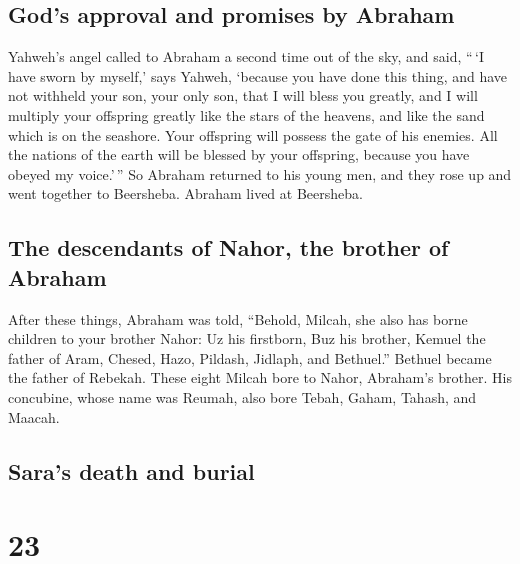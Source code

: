 \hypertarget{gods-approval-and-promises-by-abraham}{%
\subsection{God's approval and promises by
Abraham}\label{gods-approval-and-promises-by-abraham}}

 Yahweh's angel called to Abraham a second time out of
the sky,  and said, ``\,`I have sworn by myself,' says
Yahweh, `because you have done this thing, and have not withheld your
son, your only son,  that I will bless you greatly, and I
will multiply your offspring greatly like the stars of the heavens, and
like the sand which is on the seashore. Your offspring will possess the
gate of his enemies.  All the nations of the earth will
be blessed by your offspring, because you have obeyed my voice.'\,''
 So Abraham returned to his young men, and they rose up
and went together to Beersheba. Abraham lived at Beersheba.

\hypertarget{the-descendants-of-nahor-the-brother-of-abraham}{%
\subsection{The descendants of Nahor, the brother of
Abraham}\label{the-descendants-of-nahor-the-brother-of-abraham}}

 After these things, Abraham was told, ``Behold, Milcah,
she also has borne children to your brother Nahor:  Uz
his firstborn, Buz his brother, Kemuel the father of Aram,
 Chesed, Hazo, Pildash, Jidlaph, and Bethuel.''
 Bethuel became the father of Rebekah. These eight Milcah
bore to Nahor, Abraham's brother.  His concubine, whose
name was Reumah, also bore Tebah, Gaham, Tahash, and Maacah.

\hypertarget{saras-death-and-burial}{%
\subsection{Sara's death and burial}\label{saras-death-and-burial}}

\hypertarget{section-22}{%
\section{23}\label{section-22}}

